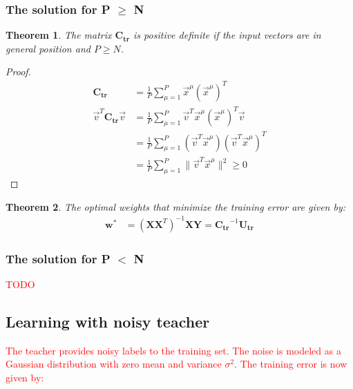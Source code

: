\documentclass[11pt]{book} %
\newtheorem{theorem}{Theorem}[section]
\begin{document}
\subsubsection{The solution for P $\geq$ N}

\begin{theorem}
    The matrix \(\mathbf{C_{tr}}\) is positive definite if the input vectors are in general position and \(P \geq N\).
\end{theorem}

\begin{proof}
    \begin{align*}
        \mathbf{C_{tr}} &= \frac{1}{P} \sum_{\mu=1}^{P} \vec{x}^\mu (\vec{x}^\mu)^T \\
        \vec{v}^T \mathbf{C_{tr}} \vec{v} &= \frac{1}{P} \sum_{\mu=1}^{P} \vec{v}^T \vec{x}^\mu (\vec{x}^\mu)^T \vec{v} \\
        &= \frac{1}{P} \sum_{\mu=1}^{P} (\vec{v}^T \vec{x}^\mu) (\vec{v}^T \vec{x}^\mu)^T \\
        &= \frac{1}{P} \sum_{\mu=1}^{P} \lVert \vec{v}^T \vec{x}^\mu \rVert^2 \geq 0
    \end{align*}
\end{proof}

\begin{theorem}
    The optimal weights that minimize the training error are given by:
    \begin{align*}
        \mathbf{w}^* &= (\mathbf{X}\mathbf{X}^T)^{-1}\mathbf{X}\mathbf{Y} = \mathbf{C_{tr}}^{-1}\mathbf{U_{tr}}
    \end{align*}
\end{theorem}


%

\subsubsection{The solution for P $<$ N}

\textcolor{red}{TODO}

%
%

\subsection{Learning with noisy teacher}

\textcolor{red}{The teacher provides noisy labels to the training set. The noise is modeled as a Gaussian distribution with zero mean and variance $\sigma^2$. The training error is now given by:}
\end{document}
